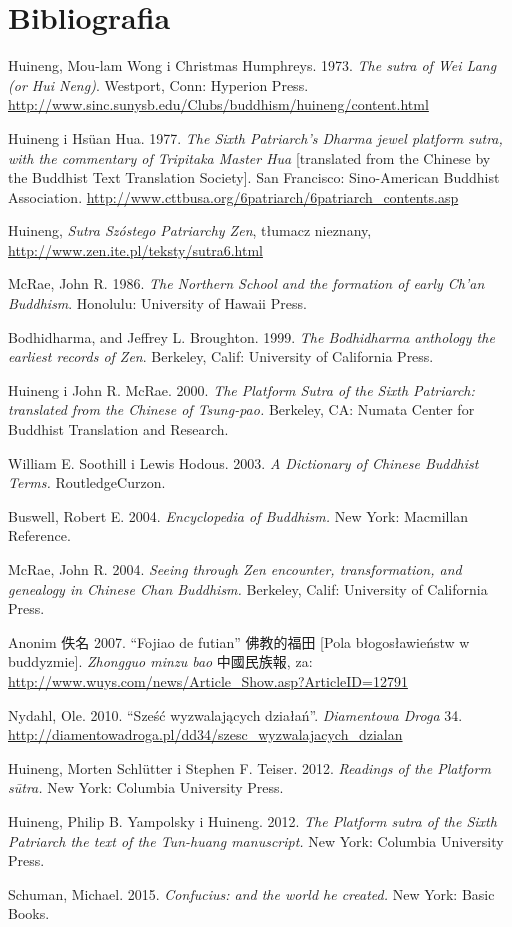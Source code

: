 \onecolumn
\section*{Bibliografia}

Huineng, Mou-lam Wong i Christmas Humphreys. 1973. \textit{The sutra of Wei Lang (or Hui Neng)}. Westport, Conn: Hyperion Press. \url{http://www.sinc.sunysb.edu/Clubs/buddhism/huineng/content.html}

Huineng i Hsüan Hua. 1977. \textit{The Sixth Patriarch's Dharma jewel platform sutra, with the commentary of Tripitaka Master Hua} [translated from the Chinese by the Buddhist Text Translation Society]. San Francisco: Sino-American Buddhist Association. \url{http://www.cttbusa.org/6patriarch/6patriarch_contents.asp}

Huineng, \textit{Sutra Szóstego Patriarchy Zen}, tłumacz nieznany, \url{http://www.zen.ite.pl/teksty/sutra6.html}

McRae, John R. 1986. \textit{The Northern School and the formation of early Ch'an Buddhism}. Honolulu: University of Hawaii Press.

Bodhidharma, and Jeffrey L. Broughton. 1999. \textit{The Bodhidharma anthology the earliest records of Zen}. Berkeley, Calif: University of California Press. 

Huineng i John R. McRae. 2000. \textit{The Platform Sutra of the Sixth Patriarch: translated from the Chinese of Tsung-pao.} Berkeley, CA: Numata Center for Buddhist Translation and Research.

William E. Soothill i Lewis Hodous. 2003. \textit{A Dictionary of Chinese Buddhist Terms.} RoutledgeCurzon.%

Buswell, Robert E. 2004. \textit{Encyclopedia of Buddhism.} New York: Macmillan Reference.

McRae, John R. 2004. \textit{Seeing through Zen encounter, transformation, and genealogy in Chinese Chan Buddhism.} Berkeley, Calif: University of California Press.

Anonim 佚名 2007. ``Fojiao de futian'' 佛教的福田 [Pola błogosławieństw w buddyzmie]. \textit{Zhongguo minzu bao} 中國民族報, za: \url{http://www.wuys.com/news/Article_Show.asp?ArticleID=12791}

Nydahl, Ole. 2010. ``Sześć wyzwalających działań''. \textit{Diamentowa Droga} 34. \url{http://diamentowadroga.pl/dd34/szesc_wyzwalajacych_dzialan}

Huineng, Morten Schlütter i Stephen F. Teiser. 2012. \textit{Readings of the Platform sūtra.} New York: Columbia University Press.%

Huineng, Philip B. Yampolsky i Huineng. 2012. \textit{The Platform sutra of the Sixth Patriarch the text of the Tun-huang manuscript.} New York: Columbia University Press.%

Schuman, Michael. 2015. \textit{Confucius: and the world he created.} New York: Basic Books.
